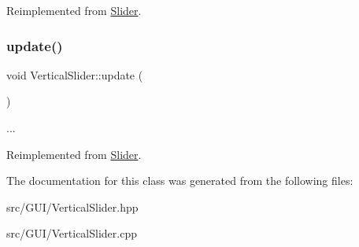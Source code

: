 Reimplemented from \hyperlink{class_slider_a834dbe16812e7bd4f0472882b0619ea9}{Slider}.

\mbox{\label{class_vertical_slider_ae868b87e37fbdac6e4906ac6b9ad465d}} 
\subsubsection{\texorpdfstring{update()}{update()}}
{\footnotesize\ttfamily void Vertical\+Slider\+::update (\begin{DoxyParamCaption}{ }\end{DoxyParamCaption})\hspace{0.3cm}{\ttfamily [virtual]}}

... 

Reimplemented from \hyperlink{class_slider_a8bcc94829fa9c1546097da4e797665cb}{Slider}.



The documentation for this class was generated from the following files\+:\begin{DoxyCompactItemize}
\item 
src/\+G\+U\+I/Vertical\+Slider.\+hpp\item 
src/\+G\+U\+I/Vertical\+Slider.\+cpp\end{DoxyCompactItemize}
